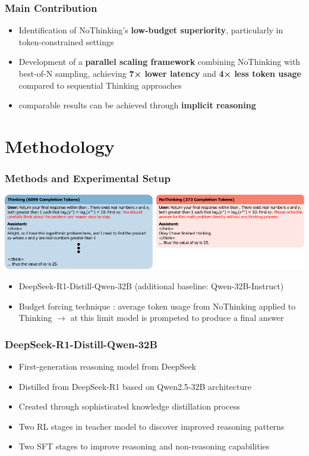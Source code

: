 \documentclass[student, noshadow, lsr, english, aspectratio=169]{ITR_LSR_slides}
\begin{document}
\begin{frame}
	\frametitle{Main Contribution}
	\begin{itemize}
		\item Identification of NoThinking's \textbf{low-budget superiority}, particularly in token-constrained settings
		\item Development of a \textbf{parallel scaling framework} combining NoThinking with best-of-N sampling, achieving \textbf{7× lower latency} and \textbf{4× less token usage} compared to sequential Thinking approaches
		\item comparable results can be achieved through \textbf{implicit reasoning}
	\end{itemize}
\end{frame}

\section{Methodology}

\begin{frame}
	\frametitle{Methods and Experimental Setup}
	\centering
	\includegraphics[width=\textwidth]{NoThinking.pdf}
	\begin{itemize}
		\item DeepSeek-R1-Distill-Qwen-32B (additional baseline: Qwen-32B-Instruct)
		\item Budget forcing technique \cite{muennighoff_s1_2025}: average token usage from NoThinking applied to Thinking $\rightarrow$ at this limit model is prompeted to produce a final answer
	\end{itemize}
\end{frame}

\begin{frame}
	\frametitle{DeepSeek-R1-Distill-Qwen-32B}
	\begin{itemize}
		\item First-generation reasoning model from DeepSeek
		\item Distilled from DeepSeek-R1 based on Qwen2.5-32B architecture
		\item Created through sophisticated knowledge distillation process
		\item Two RL stages in teacher model to discover improved reasoning patterns
		\item Two SFT stages to improve reasoning and non-reasoning capabilities
	\end{itemize}
\end{frame}
\end{document}

